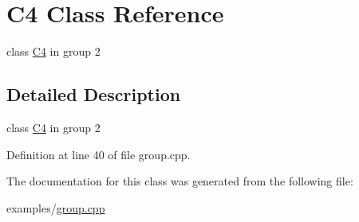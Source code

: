 \hypertarget{class_c4}{}\section{C4 Class Reference}
\label{class_c4}


class \hyperlink{class_c4}{C4} in group 2  




\subsection{Detailed Description}
class \hyperlink{class_c4}{C4} in group 2 

Definition at line 40 of file group.\+cpp.



The documentation for this class was generated from the following file\+:\begin{DoxyCompactItemize}
\item 
examples/\hyperlink{group_8cpp}{group.\+cpp}\end{DoxyCompactItemize}
